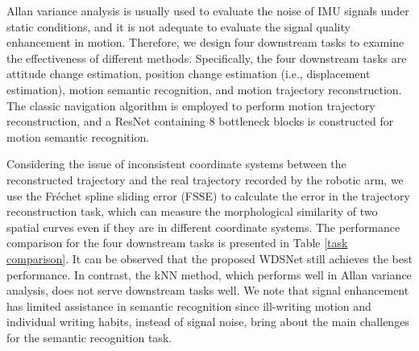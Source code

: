 \documentclass[letterpaper]{article} %
\begin{document}
	
	
	Allan variance analysis is usually used to evaluate the noise of IMU signals under static conditions, and it is not adequate to evaluate the signal quality enhancement in motion. Therefore, we design four downstream tasks to examine the effectiveness of different methods. Specifically, the four downstream tasks are attitude change estimation, position change estimation (i.e., displacement estimation), motion semantic recognition, and motion trajectory reconstruction. The classic navigation algorithm is employed to perform motion trajectory reconstruction, and a ResNet containing 8 bottleneck blocks is constructed for motion semantic recognition.
	
	
	Considering the issue of inconsistent coordinate systems between the reconstructed trajectory and the real trajectory recorded by the robotic arm, we use the Fréchet spline sliding error (FSSE) \cite{10080916} to calculate the error in the trajectory reconstruction task, which can measure the morphological similarity of two spatial curves even if they are in different coordinate systems. 
	The performance comparison for the four downstream tasks is presented in Table \ref{task comparison}.
	It can be observed that the proposed WDSNet still achieves the best performance. In contrast, the kNN method, which performs well in Allan variance analysis, does not serve downstream tasks well. We note that signal enhancement has limited assistance in semantic recognition since ill-writing motion and individual writing habits, instead of signal noise, bring about the main challenges for the semantic recognition task.
	
\end{document}
